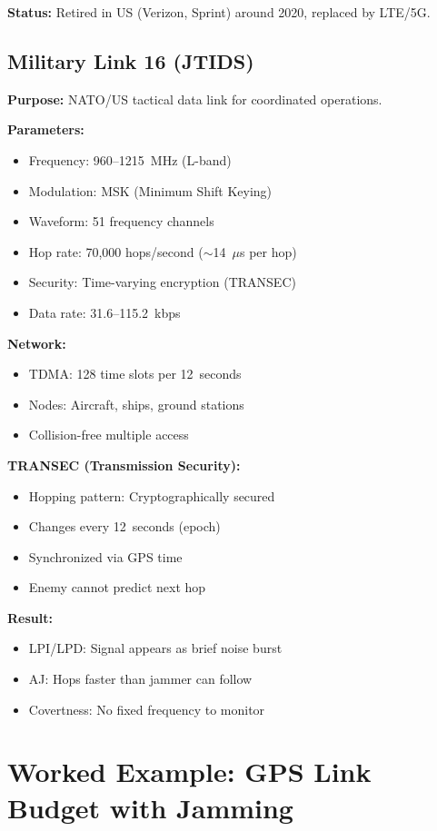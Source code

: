 \textbf{Status:} Retired in US (Verizon, Sprint) around 2020, replaced by LTE/5G.

\subsection{Military Link 16 (JTIDS)}

\textbf{Purpose:} NATO/US tactical data link for coordinated operations.

\textbf{Parameters:}
\begin{itemize}
\item Frequency: 960--1215~MHz (L-band)
\item Modulation: MSK (Minimum Shift Keying)
\item Waveform: 51 frequency channels
\item Hop rate: 70,000 hops/second ($\sim$14~$\mu$s per hop)
\item Security: Time-varying encryption (TRANSEC)
\item Data rate: 31.6--115.2~kbps
\end{itemize}

\textbf{Network:}
\begin{itemize}
\item TDMA: 128 time slots per 12~seconds
\item Nodes: Aircraft, ships, ground stations
\item Collision-free multiple access
\end{itemize}

\textbf{TRANSEC (Transmission Security):}
\begin{itemize}
\item Hopping pattern: Cryptographically secured
\item Changes every 12~seconds (epoch)
\item Synchronized via GPS time
\item Enemy cannot predict next hop
\end{itemize}

\textbf{Result:}
\begin{itemize}
\item LPI/LPD: Signal appears as brief noise burst
\item AJ: Hops faster than jammer can follow
\item Covertness: No fixed frequency to monitor
\end{itemize}

\section{Worked Example: GPS Link Budget with Jamming}

